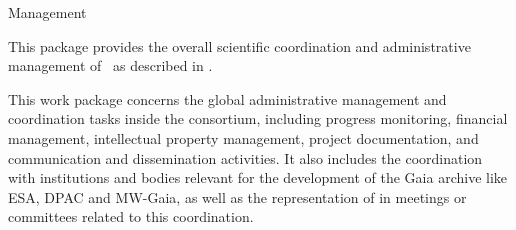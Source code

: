 
\begin{workpackage}{Management}
  \label{wp:management} %

  \wpend{\duration} %


  \makewptable %

  \begin{wpobjectives}
    This package provides the overall scientific coordination and administrative management of \acro\ as described in .
  \end{wpobjectives}

  \begin{wpdescription}

    This work package concerns the global administrative management and coordination tasks inside the consortium, including progress monitoring, financial management, intellectual property management, project documentation, and communication and dissemination activities. It also includes the coordination with institutions and bodies relevant for the development of the Gaia archive like ESA, DPAC and MW-Gaia, as well as the representation of {\acro} in meetings or committees related to this coordination.

\end{wpdescription}
\end{workpackage}
